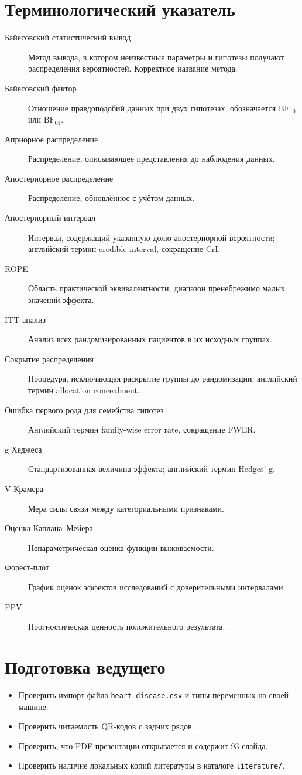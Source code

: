 \documentclass[11pt,a4paper]{article}
\begin{document}
\appendix
\section*{Терминологический указатель}
\begin{description}
\item[Байесовский статистический вывод] Метод вывода, в котором неизвестные параметры
и гипотезы получают распределения вероятностей. Корректное название метода.
\item[Байесовский фактор] Отношение правдоподобий данных при двух гипотезах;
обозначается $\mathrm{BF}_{10}$ или $\mathrm{BF}_{01}$.
\item[Априорное распределение] Распределение, описывающее представления до наблюдения данных.
\item[Апостериорное распределение] Распределение, обновлённое с учётом данных.
\item[Апостериорный интервал] Интервал, содержащий указанную долю апостериорной вероятности;
английский термин credible interval, сокращение CrI.
\item[ROPE] Область практической эквивалентности, диапазон пренебрежимо малых значений эффекта.
\item[ITT-анализ] Анализ всех рандомизированных пациентов в их исходных группах.
\item[Сокрытие распределения] Процедура, исключающая раскрытие группы до рандомизации;
английский термин allocation concealment.
\item[Ошибка первого рода для семейства гипотез] Английский термин family-wise error rate,
сокращение FWER.
\item[g Хеджеса] Стандартизованная величина эффекта; английский термин Hedges' g.
\item[V Крамера] Мера силы связи между категориальными признаками.
\item[Оценка Каплана--Мейера] Непараметрическая оценка функции выживаемости.
\item[Форест-плот] График оценок эффектов исследований с доверительными интервалами.
\item[PPV] Прогностическая ценность положительного результата.
\end{description}

\section*{Подготовка ведущего}
\begin{itemize}
\item Проверить импорт файла \texttt{heart-disease.csv} и типы переменных на своей машине.
\item Проверить читаемость QR-кодов с задних рядов.
\item Проверить, что PDF презентации открывается и содержит 93 слайда.
\item Проверить наличие локальных копий литературы в каталоге \texttt{literature/}.
\end{itemize}
\end{document}
